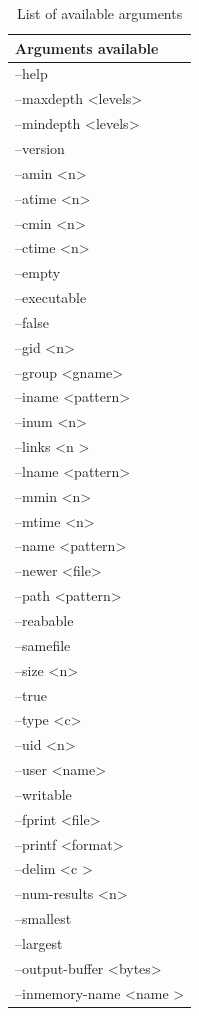 \documentclass{article}
\begin{document}
\begin{table} [h]
\centering
\begin{tabular}{l}
Arguments available \\\hline
--help\\
--maxdepth \textless levels\textgreater\\
--mindepth \textless levels\textgreater\\
--version\\
--amin \textless n\textgreater\\
--atime \textless n\textgreater\\
--cmin \textless n\textgreater\\
--ctime \textless n\textgreater\\
--empty\\
--executable\\
--false\\
--gid \textless n\textgreater\\
--group \textless gname\textgreater\\
--iname \textless pattern\textgreater\\ 
--inum \textless n\textgreater\\
--links \textless n \textgreater\\
--lname \textless pattern\textgreater\\
--mmin \textless n\textgreater\\
--mtime \textless n\textgreater\\
--name \textless pattern\textgreater\\
--newer \textless file\textgreater\\
--path \textless pattern\textgreater\\
--reabable\\
--samefile\\
--size \textless n\textgreater\\
--true\\
--type \textless c\textgreater\\
--uid \textless n\textgreater\\
--user \textless name\textgreater\\
--writable\\
--fprint \textless file\textgreater\\
--printf \textless format\textgreater\\
--delim \textless c \textgreater\\
--num-results \textless n\textgreater\\
--smallest\\
--largest\\
--output-buffer \textless bytes\textgreater\\
--inmemory-name \textless name \textgreater
\end{tabular}
\caption{\label{tab:widgets}List of available arguments}
\end{table}
\end{document}
